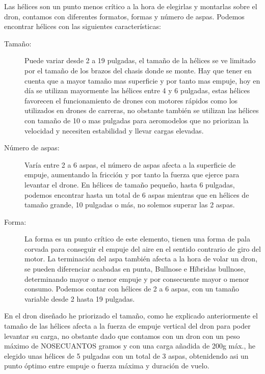 
 Las hélices son un punto menos crítico a la hora de elegirlas y montarlas sobre el dron, contamos con diferentes formatos, formas y número de aspas.
 Podemos encontrar hélices con las siguientes características:
 \begin{description}
        \item[Tamaño:] Puede variar desde 2 a 19 pulgadas, el tamaño de la hélices se ve limitado por el tamaño de los brazos del chasis donde se monte. Hay que tener en cuenta que a mayor tamaño mas superficie y por tanto mas empuje, hoy en día se utilizan mayormente las hélices entre 4 y 6 pulgadas, estas hélices favorecen el funcionamiento de drones con motores rápidos como los utilizados en drones de carreras, no obstante también se utilizan las hélices con tamaño de 10 o mas pulgadas para aeromodelos que no priorizan la velocidad y necesiten estabilidad y llevar cargas elevadas.
 		\item[Número de aspas:] Varía entre 2 a 6 aspas, el número de aspas afecta a la superficie de empuje, aumentando la fricción y por tanto la fuerza que ejerce para levantar el drone. En hélices de tamaño pequeño, hasta 6 pulgadas, podemos encontrar hasta un total de 6 aspas mientras que en hélices de tamaño grande, 10 pulgadas o más, no solemos superar las 2 aspas.
 		\item[Forma:] La forma es un punto crítico de este elemento, tienen una forma de pala corvada para conseguir el empuje del aire en el sentido contrario de giro del motor. La terminación del aspa también afecta a la hora de volar un dron, se pueden diferenciar acabadas en punta,  Bullnose e Híbridas bullnose, determinando mayor o menor empuje y por consecuente mayor o menor consumo.
 Podemos contar con hélices de 2 a 6 aspas, con un tamaño variable desde 2  hasta 19 pulgadas.
 
 \end{description}
 
 En el dron diseñado he priorizado el tamaño, como he explicado anteriormente el tamaño de las hélices afecta a la fuerza de empuje vertical del dron para poder levantar su carga, no obstante dado que contamos con un dron con un peso máximo de NOSECUANTOS gramos y con una carga añadida de 200g máx., he elegido unas hélices de 5 pulgadas con un total de 3 aspas, obtenidendo asi un punto óptimo entre empuje o fuerza máxima y duración de vuelo.
 

 
